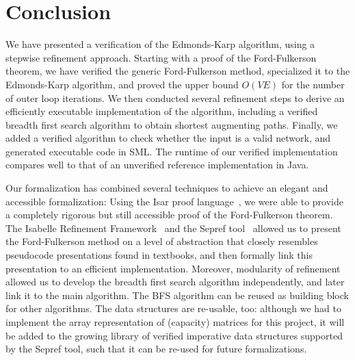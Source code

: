 \documentclass{llncs}
\begin{document}
    

\section{Conclusion}\label{sec:concl}
  We have presented a verification of the Edmonds-Karp algorithm, using a stepwise refinement approach.
  Starting with a proof of the Ford-Fulkerson theorem, we have verified the generic Ford-Fulkerson method, 
  specialized it to the Edmonds-Karp algorithm, and proved the upper bound $O(VE)$ for the number of outer loop iterations.
  We then conducted several refinement steps to derive an efficiently executable implementation of the algorithm, 
  including a verified breadth first search algorithm to obtain shortest augmenting paths. 
  Finally, we added a verified algorithm to check whether the input is a valid network, and generated executable code in SML.
  The runtime of our verified implementation compares well to that of an unverified reference implementation in Java.
  
  Our formalization has combined several techniques to achieve an elegant and accessible formalization: 
  Using the Isar proof language~\cite{Wenzel99}, we were able to provide a completely rigorous but 
  still accessible proof of the Ford-Fulkerson theorem. The Isabelle Refinement Framework~\cite{LaTu12,La12} and the Sepref tool~\cite{La15,La16}
  allowed us to present the Ford-Fulkerson method on a level 
  of abstraction that closely resembles pseudocode presentations found in textbooks, and then formally link this presentation to an efficient
  implementation. Moreover, modularity of refinement allowed us to develop the breadth first search algorithm independently, and later link it to the 
  main algorithm. The BFS algorithm can be reused as building block for other algorithms. The data structures are re-usable, too: although we had to implement the array representation of (capacity) matrices for this project, it will be added to the growing library of verified imperative data structures 
  supported by the Sepref tool, such that it can be re-used for future formalizations.
  
\end{document}
